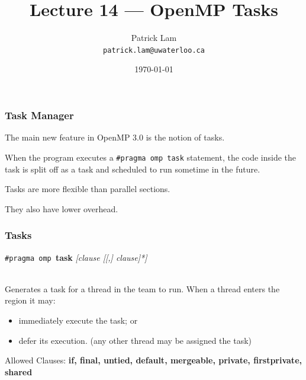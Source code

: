 

\title{Lecture 14 --- OpenMP Tasks }

\author{Patrick Lam \\ \small \texttt{patrick.lam@uwaterloo.ca}}
\date{\today}




\begin{frame}
  \titlepage

 \end{frame}


\begin{frame}[fragile]
\frametitle{Task Manager}

The main new feature in OpenMP 3.0 is the notion of \alert{tasks}. 

When the program executes a \verb+#pragma omp task+ statement, the code
inside the task is split off as a task and scheduled to run sometime
in the future. 

Tasks are more flexible than parallel sections.

They also have lower overhead.

\end{frame}


\begin{frame}
\frametitle{Tasks}

 \begin{center}
    {\tt \#pragma omp }{\bf task} {\it [clause [[,] clause]*]}
  \end{center}~\\

Generates a task for a thread in the team to run.
     When a thread enters the region it may:
\begin{itemize}
        \item immediately execute the task; or
        \item defer its execution. (any other thread may be assigned the task)
\end{itemize}

  Allowed Clauses: {\bf if, final, untied, default, mergeable, private,
  firstprivate, shared}

\end{frame}


